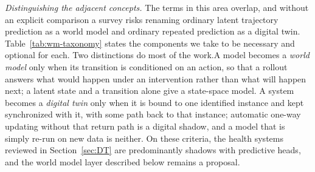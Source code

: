 \documentclass[journal]{IEEEtran}
\newif\ifsubmission
\begin{document}
\emph{Distinguishing the adjacent concepts.} The terms in this area overlap, and without an explicit comparison a survey risks renaming ordinary latent trajectory prediction as a world model and ordinary repeated prediction as a digital twin. \ifsubmission Two criteria do most of the work.\else Table~\ref{tab:wm-taxonomy} states the components we take to be necessary and optional for each. Two distinctions do most of the work.\fi A model becomes a \emph{world model} only when its transition is conditioned on an action, so that a rollout answers what would happen under an intervention rather than what will happen next; a latent state and a transition alone give a state-space model. A system becomes a \emph{digital twin} only when it is bound to one identified instance and kept synchronized with it, with some path back to that instance; automatic one-way updating without that return path is a digital shadow, and a model that is simply re-run on new data is neither. On these criteria, the health systems reviewed in Section~\ref{sec:DT} are predominantly shadows with predictive heads, and the world model layer described below remains a proposal.
\end{document}
